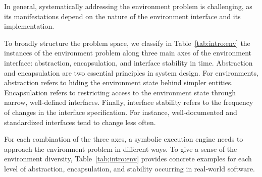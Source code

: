 In general, systematically addressing the environment problem is challenging, as its manifestations depend on the nature of the environment interface and its implementation.

To broadly structure the problem space, we classify in Table~\ref{tab:intro:env} the instances of the environment problem along three main axes of the environment interface: abstraction, encapsulation, and interface stability in time.
%
Abstraction and encapsulation are two essential principles in system design.  For environments, abstraction refers to hiding the environment state behind simpler entities.
%
Encapsulation refers to restricting access to the environment state through narrow, well-defined interfaces.
%
Finally, interface stability refers to the frequency of changes in the interface specification.  For instance, well-documented and standardized interfaces tend to change less often.

For each combination of the three axes, a symbolic execution engine needs to approach the environment problem in different ways.
%
To give a sense of the environment diversity, Table~\ref{tab;intro:env} provides concrete examples for each level of abstraction, encapsulation, and stability occurring in real-world software.



